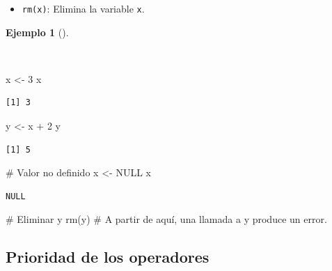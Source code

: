 \documentclass[
  a4paper,
]{scrreport}
\newenvironment{Shaded}{\begin{snugshade}}{\end{snugshade}}
\newcommand{\CommentTok}[1]{\textcolor[rgb]{0.37,0.37,0.37}{#1}}
\newcommand{\ConstantTok}[1]{\textcolor[rgb]{0.56,0.35,0.01}{#1}}
\newcommand{\DecValTok}[1]{\textcolor[rgb]{0.68,0.00,0.00}{#1}}
\newcommand{\FunctionTok}[1]{\textcolor[rgb]{0.28,0.35,0.67}{#1}}
\newcommand{\NormalTok}[1]{\textcolor[rgb]{0.00,0.23,0.31}{#1}}
\newcommand{\OtherTok}[1]{\textcolor[rgb]{0.00,0.23,0.31}{#1}}
\newcommand{\SpecialCharTok}[1]{\textcolor[rgb]{0.37,0.37,0.37}{#1}}
\providecommand{\tightlist}{%
  \setlength{\itemsep}{0pt}\setlength{\parskip}{0pt}}\usepackage{longtable,booktabs,array}
\theoremstyle{definition}
\theoremstyle{definition}
\newtheorem{example}{Ejemplo}[chapter]
\theoremstyle{remark}
\begin{document}
\begin{itemize}
\tightlist
\item
  \texttt{rm(x)}: Elimina la variable \texttt{x}.
\end{itemize}

\begin{example}[]\protect\hypertarget{exm-variables}{}\label{exm-variables}

~

\begin{Shaded}
\begin{Highlighting}[]
\NormalTok{x }\OtherTok{\textless{}{-}} \DecValTok{3}
\NormalTok{x}
\end{Highlighting}
\end{Shaded}

\begin{verbatim}
[1] 3
\end{verbatim}

\begin{Shaded}
\begin{Highlighting}[]
\NormalTok{y }\OtherTok{\textless{}{-}}\NormalTok{ x }\SpecialCharTok{+} \DecValTok{2}
\NormalTok{y}
\end{Highlighting}
\end{Shaded}

\begin{verbatim}
[1] 5
\end{verbatim}

\begin{Shaded}
\begin{Highlighting}[]
\CommentTok{\# Valor no definido}
\NormalTok{x }\OtherTok{\textless{}{-}} \ConstantTok{NULL}
\NormalTok{x}
\end{Highlighting}
\end{Shaded}

\begin{verbatim}
NULL
\end{verbatim}

\begin{Shaded}
\begin{Highlighting}[]
\CommentTok{\# Eliminar y}
\FunctionTok{rm}\NormalTok{(y)}
\CommentTok{\# A partir de aquí, una llamada a y produce un error.}
\end{Highlighting}
\end{Shaded}

\end{example}

\subsection{Prioridad de los
operadores}\label{prioridad-de-los-operadores}
\end{document}
